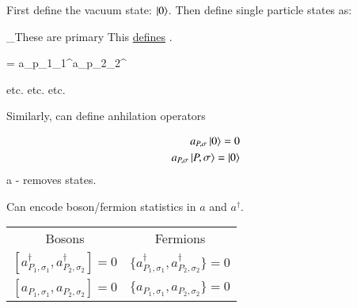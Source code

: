 {First define the vacuum state: $\ket{0}$.
Then define single particle states as:

\be
{}_{\textrm{These are primary}} \equiv \adagger {}
\ee
This \underline{defines} \adagger.



\be
{} = a_{p_1\sigma_1}^\dagger a_{p_2\sigma_2}^\dagger {}
\ee

etc. etc. etc.


Similarly,  can define anhilation operators


\begin{align*}
a_{P,\sigma} \ket{0} = 0\\
a_{P,\sigma} \ket{P,\sigma} = \ket{0}
\end{align*}
a - removes states. 


Can encode boson/fermion statistics in $a$ and $a^\dagger$.

\begin{center}
\begin{tabular}{c|c}
Bosons & Fermions \\
$[a_{P_1,\sigma_1}^\dagger, a_{P_2,\sigma_2}^\dagger] = 0 $  &  $\{a_{P_1,\sigma_1}^\dagger, a_{P_2,\sigma_2}^\dagger\} = 0 $\\  
$[a_{P_1,\sigma_1}, a_{P_2,\sigma_2}] = 0  $  &  $\{a_{P_1,\sigma_1}, a_{P_2,\sigma_2}\} = 0  $\\  
\end{tabular}
\end{center}



}



